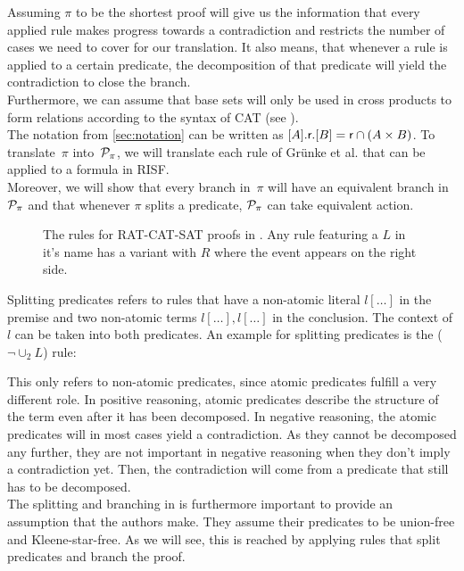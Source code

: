 \documentclass[a4paper,twoside,12pt, english]{article}
\begin{document}
Assuming $\pi$ to be the shortest proof will give us the information that every applied rule makes progress towards a contradiction and restricts the number of cases we need to cover for our translation. It also means, that whenever a rule is applied to a certain predicate, the decomposition of that predicate will yield the contradiction to close the branch. \\
Furthermore, we can assume that base sets will only be used in cross products to form relations according to the syntax of CAT (see ). \\
The notation from \cref{sec:notation} can be written as $[A].\textsf{\upshape r}.[B] = \textsf{\upshape r} \cap (A \times B)$. 
To translate~$\pi$ into~$\mathcal{P}_\pi$, we will translate each rule of Grünke et al. that can be applied to a formula in RISF.\\ \newpage
Moreover, we will show that every branch in~$\pi$ will have an equivalent branch in~$\mathcal{P}_\pi$ and that whenever $\pi$ splits a predicate, $\mathcal{P}_\pi$ can take equivalent action.

\begin{figure}[htpb]\label{fig:rules}
\centering

\vspace*{-0.5cm}
\caption{The rules for RAT-CAT-SAT proofs in \cite[p. 13]{Gru+26}. Any rule featuring a $L$ in it's name has a variant with $R$ where the event appears on the right side.}
\end{figure}

\noindent Splitting predicates refers to rules that have a non-atomic literal $l[\dots]$ in the premise and two non-atomic terms $l[\dots], l[\dots]$ in the conclusion. The context of $l$ can be taken into both predicates. 
An example for splitting predicates is the ($\neg {\cup_2}L$) rule:
\begin{mathpar} 
\end{mathpar}
This only refers to non-atomic predicates, since atomic predicates fulfill a very different role. In positive reasoning, atomic predicates describe the structure of the term even after it has been decomposed. In negative reasoning, the atomic predicates will in most cases yield a contradiction.
As they cannot be decomposed any further, they are not important in negative reasoning when they don't imply a contradiction yet. Then, the contradiction will come from a predicate that still has to be decomposed. \\
The splitting and branching in \cite{Gru+26} is furthermore important to provide an assumption that the authors make. They assume their predicates to be union-free and Kleene-star-free. As we will see, this is reached by applying rules that split predicates and branch the proof.
\end{document}

